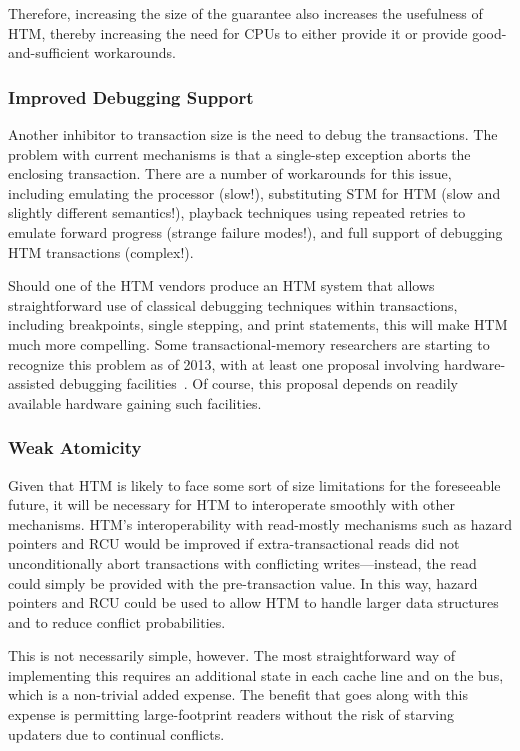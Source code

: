Therefore, increasing the size of the guarantee also increases the
usefulness of HTM, thereby increasing the need for CPUs to either
provide it or provide good-and-sufficient workarounds.

\subsubsection{Improved Debugging Support}
\label{sec:future:Improved Debugging Support}

Another inhibitor to transaction size is the need to debug the transactions.
The problem with current mechanisms is that a single-step exception
aborts the enclosing transaction.
There are a number of workarounds for this issue, including emulating
the processor (slow!), substituting STM for HTM (slow and slightly
different semantics!),
playback techniques using repeated retries to emulate forward
progress (strange failure modes!), and
full support of debugging HTM transactions (complex!).

Should one of the HTM vendors produce an HTM system that allows
straightforward use of classical debugging techniques within
transactions, including breakpoints, single stepping, and
print statements, this will make HTM much more compelling.
Some transactional-memory researchers are starting to recognize this
problem as of 2013, with at least one proposal involving hardware-assisted
debugging facilities~\cite{JustinGottschlich2013TMdebug}.
Of course, this proposal depends on readily available hardware gaining such
facilities.

\subsubsection{Weak Atomicity}
\label{sec:future:Weak Atomicity}

Given that HTM is likely to face some sort of size limitations for the
foreseeable future, it will be necessary for HTM to interoperate
smoothly with other mechanisms.
HTM's interoperability with read-mostly mechanisms such as hazard pointers
and RCU would be improved if extra-transactional reads did not
unconditionally abort transactions with conflicting writes---instead,
the read could simply be provided with the pre-transaction value.
In this way, hazard pointers and RCU could be used to allow HTM to handle
larger data structures and to reduce conflict probabilities.

This is not necessarily simple, however.
The most straightforward way of implementing this requires an additional
state in each cache line and on the bus, which is a non-trivial added
expense.
The benefit that goes along with this expense is permitting
large-footprint readers without the risk of starving updaters due
to continual conflicts.

